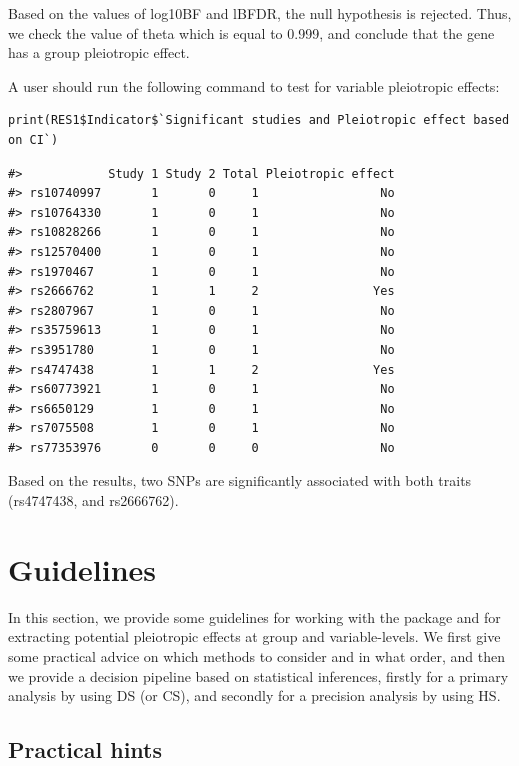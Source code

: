 Based on the values of log10BF and lBFDR, the null hypothesis is rejected. Thus, we check the value of theta which is equal to 0.999, and conclude that the gene has a group pleiotropic effect.

A user should run the following command to test for variable pleiotropic effects:

\begin{verbatim}
print(RES1$Indicator$`Significant studies and Pleiotropic effect based on CI`)
\end{verbatim}

\begin{verbatim}
#>            Study 1 Study 2 Total Pleiotropic effect
#> rs10740997       1       0     1                 No
#> rs10764330       1       0     1                 No
#> rs10828266       1       0     1                 No
#> rs12570400       1       0     1                 No
#> rs1970467        1       0     1                 No
#> rs2666762        1       1     2                Yes
#> rs2807967        1       0     1                 No
#> rs35759613       1       0     1                 No
#> rs3951780        1       0     1                 No
#> rs4747438        1       1     2                Yes
#> rs60773921       1       0     1                 No
#> rs6650129        1       0     1                 No
#> rs7075508        1       0     1                 No
#> rs77353976       0       0     0                 No
\end{verbatim}

Based on the results, two SNPs are significantly associated with both traits (rs4747438, and rs2666762).

\hypertarget{guidelines}{%
\section{Guidelines}\label{guidelines}}

In this section, we provide some guidelines for working with the  package and for extracting potential pleiotropic effects at group and variable-levels.
We first give some practical advice on which methods to consider and in what order, and then we provide a decision pipeline based on statistical inferences, firstly for a primary analysis by using DS (or CS), and secondly for a precision analysis by using HS.

\hypertarget{practical-hints}{%
\subsection{Practical hints}\label{practical-hints}}

